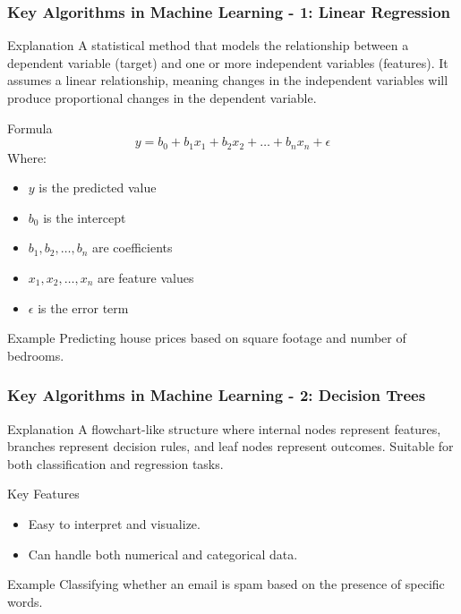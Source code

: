 \documentclass{beamer}
\begin{document}
\begin{frame}[fragile]
    \frametitle{Key Algorithms in Machine Learning - 1: Linear Regression}
    \begin{block}{Explanation}
        A statistical method that models the relationship between a dependent variable (target) and one or more independent variables (features). It assumes a linear relationship, meaning changes in the independent variables will produce proportional changes in the dependent variable.
    \end{block}
    
    \begin{block}{Formula}
        \begin{equation}
            y = b_0 + b_1 x_1 + b_2 x_2 + \ldots + b_n x_n + \epsilon 
        \end{equation}
        Where:
        \begin{itemize}
            \item $y$ is the predicted value
            \item $b_0$ is the intercept
            \item $b_1, b_2, \ldots, b_n$ are coefficients
            \item $x_1, x_2, \ldots, x_n$ are feature values
            \item $\epsilon$ is the error term
        \end{itemize}
    \end{block}

    \begin{block}{Example}
        Predicting house prices based on square footage and number of bedrooms.
    \end{block}
\end{frame}

\begin{frame}[fragile]
    \frametitle{Key Algorithms in Machine Learning - 2: Decision Trees}
    \begin{block}{Explanation}
        A flowchart-like structure where internal nodes represent features, branches represent decision rules, and leaf nodes represent outcomes. Suitable for both classification and regression tasks.
    \end{block}

    \begin{block}{Key Features}
        \begin{itemize}
            \item Easy to interpret and visualize.
            \item Can handle both numerical and categorical data.
        \end{itemize}
    \end{block}

    \begin{block}{Example}
        Classifying whether an email is spam based on the presence of specific words.
    \end{block}
\end{frame}
\end{document}
